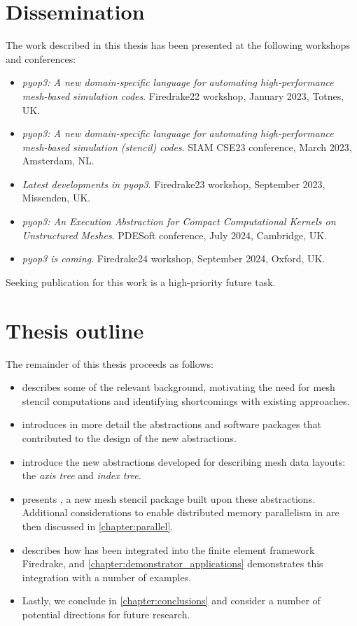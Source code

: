 \documentclass[thesis]{subfiles}
\begin{document}
\section{Dissemination}

The work described in this thesis has been presented at the following workshops and conferences:
\begin{itemize}
  \item
    \emph{pyop3: A new domain-specific language for automating high-performance mesh-based simulation codes}.
    Firedrake22 workshop, January 2023, Totnes, UK.
  \item
    \emph{pyop3: A new domain-specific language for automating high-performance mesh-based simulation (stencil) codes}.
    SIAM CSE23 conference, March 2023, Amsterdam, NL.
  \item
    \emph{Latest developments in pyop3}.
    Firedrake23 workshop, September 2023, Missenden, UK.
  \item
    \emph{pyop3: An Execution Abstraction for Compact Computational Kernels on Unstructured Meshes}.
    PDESoft conference, July 2024, Cambridge, UK.
  \item
    \emph{pyop3 is coming}.
    Firedrake24 workshop, September 2024, Oxford, UK.
\end{itemize}
Seeking publication for this work is a high-priority future task.

\section{Thesis outline}

The remainder of this thesis proceeds as follows:
\begin{itemize}
  \item
     describes some of the relevant background, motivating the need for mesh stencil computations and identifying shortcomings with existing approaches.
  \item
     introduces in more detail the abstractions and software packages that contributed to the design of the new abstractions.
  \item
     introduce the new abstractions developed for describing mesh data layouts: the \emph{axis tree} and \emph{index tree}.
  \item
     presents , a new mesh stencil package built upon these abstractions.
    Additional considerations to enable distributed memory parallelism in  are then discussed in \cref{chapter:parallel}.
  \item {} describes how  has been integrated into the finite element framework Firedrake, and \cref{chapter:demonstrator_applications} demonstrates this integration with a number of examples.
  \item Lastly, we conclude in \cref{chapter:conclusions} and consider a number of potential directions for future research.
\end{itemize}
\end{document}
